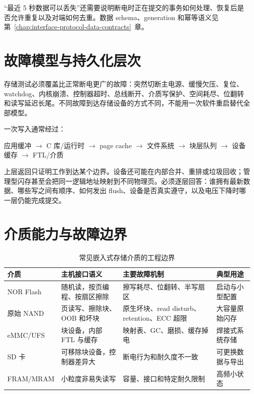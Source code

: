 “最近 5 秒数据可以丢失”还需要说明断电时正在提交的事务如何处理、恢复后是否允许重复以及对端如何去重。数据 schema、generation 和幂等语义见\mbox{第~\ref{chap:interface-protocol-data-contracts}~章}。

\section{故障模型与持久化层次}

存储测试必须覆盖比正常断电更广的故障：突然切断主电源、缓慢欠压、复位、watchdog、内核崩溃、控制器超时、总线断开、介质写保护、空间耗尽、位翻转和读写延迟长尾。不同故障到达存储设备的方式不同，不能用一次软件重启替代全部模型。

一次写入通常经过：

\begin{center}
应用缓冲 $\rightarrow$ C 库/运行时 $\rightarrow$ page cache $\rightarrow$ 文件系统 $\rightarrow$ 块层队列 $\rightarrow$ 设备缓存 $\rightarrow$ FTL/介质
\end{center}

上层返回只证明工作到达某个边界。设备还可能在内部合并、重排或垃圾回收；管理型闪存甚至会把同一逻辑地址映射到不同物理页。必须逐层回答：谁拥有最新数据、哪些写之间有顺序、如何发出 flush、设备是否真实遵守，以及电压下降时哪一层仍能完成提交。

\section{介质能力与故障边界}

\begin{table}[H]
  \centering
  \caption{常见嵌入式存储介质的工程边界}
  \begin{tabular}{p{24mm}p{39mm}p{40mm}p{26mm}}
    \hline
    介质 & 主机接口语义 & 主要故障机制 & 典型用途 \\
    \hline
    NOR Flash & 随机读，按页编程、按扇区擦除 & 擦写耗尽、位翻转、半写扇区 & 启动与小型配置 \\
    原始 NAND & 页读写、擦除块、OOB 和坏块 & 原生坏块、read disturb、retention、ECC 超限 & 大容量原始闪存 \\
    eMMC/UFS & 块设备，内部 FTL 与缓存 & 映射表、GC、磨损、缓存掉电 & 焊接式系统存储 \\
    SD 卡 & 可移除块设备，控制器差异大 & 断电行为和耐久度不一致 & 可更换数据与导出 \\
    {\small FRAM/MRAM} & 小粒度非易失读写 & 容量、接口和特定耐久限制 & 高频小状态 \\
    \hline
  \end{tabular}
\end{table}

